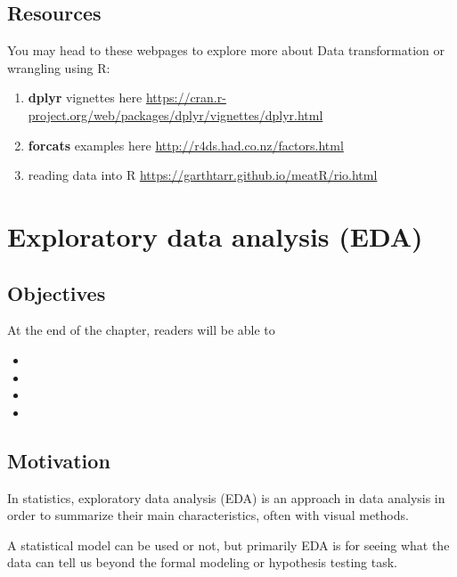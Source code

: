 \documentclass[
  10pt,
]{krantz}
\providecommand{\tightlist}{%
  \setlength{\itemsep}{0pt}\setlength{\parskip}{0pt}}
\begin{document}
\hypertarget{resources}{%
\section{Resources}\label{resources}}

You may head to these webpages to explore more about Data transformation or wrangling using R:

\begin{enumerate}
\def\labelenumi{\arabic{enumi}.}
\tightlist
\item
  \textbf{dplyr} vignettes here \url{https://cran.r-project.org/web/packages/dplyr/vignettes/dplyr.html}
\item
  \textbf{forcats} examples here \url{http://r4ds.had.co.nz/factors.html}
\item
  reading data into R \url{https://garthtarr.github.io/meatR/rio.html}
\end{enumerate}

\hypertarget{exploratory-data-analysis-eda}{%
\chapter{Exploratory data analysis (EDA)}\label{exploratory-data-analysis-eda}}

\hypertarget{objectives-4}{%
\section{Objectives}\label{objectives-4}}

At the end of the chapter, readers will be able to

\begin{itemize}
\tightlist
\item
\item
\item
\item
\end{itemize}

\hypertarget{motivation}{%
\section{Motivation}\label{motivation}}

In statistics, exploratory data analysis (EDA) is an approach in data analysis in order to summarize their main characteristics, often with visual methods.

A statistical model can be used or not, but primarily EDA is for seeing what the data can tell us beyond the formal modeling or hypothesis testing task.
\end{document}
